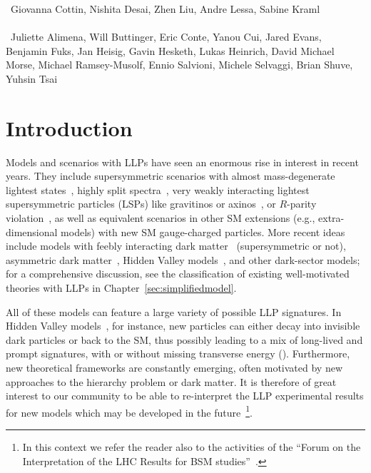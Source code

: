 ~Giovanna Cottin, Nishita Desai, Zhen Liu, Andre Lessa, Sabine Kraml\\
\text{ \; }\\
~Juliette Alimena, Will Buttinger, Eric Conte, Yanou Cui, Jared Evans, Benjamin Fuks, Jan Heisig, Gavin Hesketh, Lukas Heinrich, David Michael Morse, Michael Ramsey-Musolf, Ennio Salvioni, Michele Selvaggi, Brian Shuve, Yuhsin Tsai
\text{ \; }\\

\section{Introduction}
\label{sec:ch5-introduction}

Models and scenarios with LLPs have seen an enormous rise in interest in recent years.
They include supersymmetric scenarios with almost mass-degenerate lightest states~\cite{Chen:1995yu,Feng:1999fu},
highly split spectra~\cite{ArkaniHamed:2004fb,Giudice:2004tc}, very weakly interacting
lightest supersymmetric particles (LSPs) like gravitinos or
axinos~\cite{Pagels:1981ke,Covi:1999ty}, or $R$-parity violation~\cite{Barbier:2004ez},
as well as equivalent scenarios in other SM extensions (e.g., extra-dimensional models) with new SM gauge-charged particles.
More recent ideas include models with feebly interacting dark matter~\cite{Hall:2009bx} (supersymmetric or not), asymmetric dark matter~\cite{Zurek:2013wia}, Hidden Valley models~\cite{Strassler:2006im}, and other dark-sector models; for a comprehensive discussion, see the classification of existing well-motivated theories with LLPs in Chapter~\ref{sec:simplifiedmodel}.

All of these models can feature a large variety of possible LLP signatures. In Hidden Valley models~\cite{Strassler:2006im}, for instance,
new particles can either decay into invisible dark particles or back to the SM, thus possibly leading to a
mix of long-lived and prompt signatures, with or without missing transverse energy (\MET).
Furthermore, new theoretical frameworks are constantly emerging, often motivated by
new approaches to the hierarchy problem or dark matter.
It is therefore of great interest to our community to be able to
re-interpret the LLP experimental results
for new models which may be developed in the future~\footnote{In this context we refer the reader also to
the activities of the ``Forum on the Interpretation of the LHC Results for BSM studies''~\cite{reinterpretationForum}.}.

